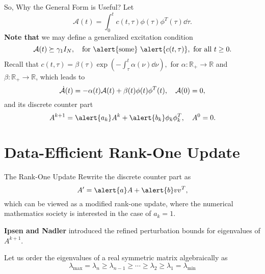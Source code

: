 \documentclass[handout]{beamer}
\theoremstyle{plain}
\theoremstyle{definition}
\theoremstyle{remark}
\newcommand{\MC}[1]{\mathcal{#1}}
\newcommand{\MB}[1]{\mathbb{#1}}
\begin{document}
\begin{frame}{So, Why the General Form is Useful?}
	Let
	\begin{equation*}
		\MC{A}(t) = \int_0^t c(t, \tau) \phi(\tau) \phi^T(\tau) \dd{\tau}.
	\end{equation*}
	\textbf{Note that} we may define a \alert{generalized} excitation condition
	\begin{equation*}
		\MC{A}(t) \succeq \gamma_1 I_N \qc \text{for \alert{some} } \alert{c(t,
		\tau)},\ \text{for all } t \ge 0.
	\end{equation*}
	\pause
	Recall that
	$ c(t, \tau) = \beta(\tau) \exp(- \int_\tau^t \alpha(\nu) \dd{\nu}), $
	for $\alpha: \MB{R}_{+} \to \MB{R}$ and $\beta: \MB{R}_{+} \to \MB{R}$,
	which leads to 
	\begin{equation*}
		\dot{\MC{A}}(t) = - \alpha(t) \MC{A}(t) + \beta(t) \phi(t) \phi^T(t) \qc
		\MC{A}(0) = 0,
	\end{equation*}
	and its discrete counter part
	\begin{equation*}
		A^{k+1} = \alert{a_k} A^k + \alert{b_k} \phi_k \phi_k^T \qc A^0 = 0.
	\end{equation*}
\end{frame}


\section{Data-Efficient Rank-One Update}

\begin{frame}{The Rank-One Update}
	Rewrite the discrete counter part as
	\begin{equation*}
		A^\prime = \alert{a} A + \alert{b} v v^T,
	\end{equation*}
	which can be viewed as a modified rank-one
	update, where the numerical mathematics
	society is interested in the case of $a_k = 1$.
	\pause

	\vspace{1em}
	\textbf{Ipsen and Nadler} introduced the
	refined perturbation bounds for eigenvalues of $A^{k+1}$.

	\vspace{1em}
	Let us order the eigenvalues of a real symmetric matrix algebraically as
	\begin{equation*}
		\lambda_{\max} = \lambda_n \ge \lambda_{n-1} \ge \cdots \ge \lambda_2 \ge
		\lambda_1 = \lambda_{\min}
	\end{equation*}
\end{frame}
\end{document}
